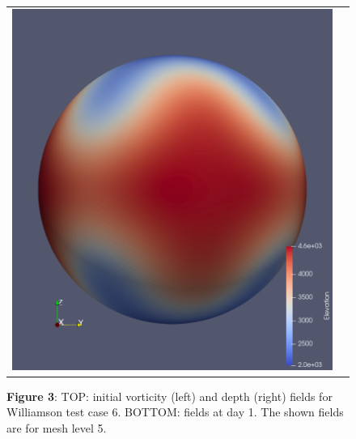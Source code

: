 \documentclass[a4paper]{article}
\begin{document}
\begin{figure}[t]
\begin{tabular}{cc}
 \hspace{-0em}\includegraphics[scale=0.125]{Images/elevation_24.png} \\
 \end{tabular}\vspace{-10pt}
  \caption*{{\bfseries Figure 3}: TOP: initial vorticity (left) and depth (right) fields
  for Williamson test case 6. BOTTOM: fields at day 1. The shown fields are for mesh level 5.
  }
  \end{figure}
\end{document}
